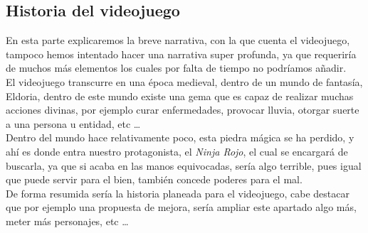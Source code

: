 \documentclass[a4paper]{article}
\begin{document}
\subsection{Historia del videojuego}
En esta parte explicaremos la breve narrativa, con la que cuenta el videojuego, tampoco hemos intentado hacer una narrativa super profunda, ya que requeriría de muchos más elementos
los cuales por falta de tiempo no podríamos añadir.\\
El videojuego transcurre en una época medieval, dentro de un mundo de fantasía, Eldoria, dentro de este mundo existe una gema que es capaz de realizar muchas acciones divinas, por ejemplo
curar enfermedades, provocar lluvia, otorgar suerte a una persona u entidad, etc \dots \\
Dentro del mundo hace relativamente poco, esta piedra mágica se ha perdido, y ahí es donde entra nuestro protagonista, el \textit{Ninja Rojo}, el cual se encargará de buscarla, ya que
si acaba en las manos equivocadas, sería algo terrible, pues igual que puede servir para el bien, también concede poderes para el mal.\\
De forma resumida sería la historia planeada para el videojuego, cabe destacar que por ejemplo una propuesta de mejora, sería ampliar este apartado algo más, meter más personajes, etc \dots

\clearpage

\end{document}
